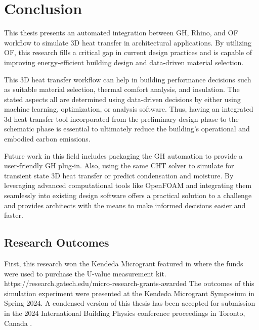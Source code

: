 \chapter{Conclusion}
This thesis presents an automated integration between GH, Rhino, and OF workflow to simulate 3D heat transfer in architectural applications. 
By utilizing OF, this research fills a critical gap in current design practices and is capable of improving energy-efficient building design and data-driven material selection. 

This 3D heat transfer workflow can help in building performance decisions such as suitable material selection, thermal comfort analysis, and insulation.
The stated aspects all are determined using data-driven decisions by either using machine learning, optimization, or analysis software. Thus, having an integrated 3d heat transfer tool incorporated from the preliminary design phase to the schematic phase is essential to ultimately reduce the building's operational and embodied carbon emissions. 

Future work in this field includes packaging the GH automation to provide a user-friendly GH plug-in. Also, using the same CHT solver to simulate for transient state 3D heat transfer or predict condensation and moisture. By leveraging advanced computational tools like OpenFOAM and integrating them seamlessly into existing design software offers a practical solution to a challenge and provides architects with the means to make informed decisions easier and faster. 

\section{Research Outcomes}
First, this research won the Kendeda Microgrant featured in \cite{kendeda} where the funds were used to purchase the U-value measurement kit. https://research.gatech.edu/micro-research-grants-awarded
The outcomes of this simulation experiment were presented at the Kendeda Microgrant Symposium in Spring 2024. 
A condensed version of this thesis has been accepted for submission in the 2024 International Building Physics conference proceedings in Toronto, Canada \cite{ibpc}. 


